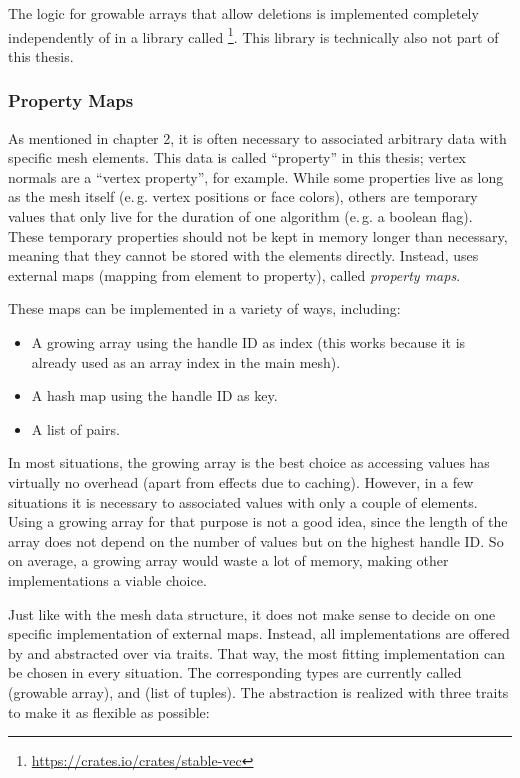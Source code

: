 The logic for growable arrays that allow deletions is implemented completely independently of  in a library called \footnote{\url{https://crates.io/crates/stable-vec}}.
This library is technically also not part of this thesis.






\subsubsection*{Property Maps}

As mentioned in chapter 2, it is often necessary to associated arbitrary data with specific mesh elements.
This data is called \enquote{property} in this thesis; vertex normals are a \enquote{vertex property}, for example.
While some properties live as long as the mesh itself (e.\,g. vertex positions or face colors),  others are temporary values that only live for the duration of one algorithm (e.\,g. a boolean  flag).
These temporary properties should not be kept in memory longer than necessary, meaning that they cannot be stored with the elements directly.
Instead,  uses external maps (mapping from element to property), called \emph{property maps}.

These maps can be implemented in a variety of ways, including:

\begin{itemize}
\item A growing array using the handle ID as index (this works because it is already used as an array index in the main mesh).
\item A hash map using the handle ID as key.
\item A list of  pairs.
\end{itemize}

In most situations, the growing array is the best choice as accessing values has virtually no overhead (apart from effects due to caching).
However, in a few situations it is necessary to associated values with only a couple of elements.
Using a growing array for that purpose is not a good idea, since the length of the array does not depend on the number of values but on the highest handle ID.
So on average, a growing array would waste a lot of memory, making other implementations a viable choice.

Just like with the mesh data structure, it does not make sense to decide on one specific implementation of external maps.
Instead, all implementations are offered by  and abstracted over via traits.
That way, the most fitting implementation can be chosen in every situation.
The corresponding types are currently called  (growable array),  and  (list of tuples).
The abstraction is realized with three traits to make it as flexible as possible:

